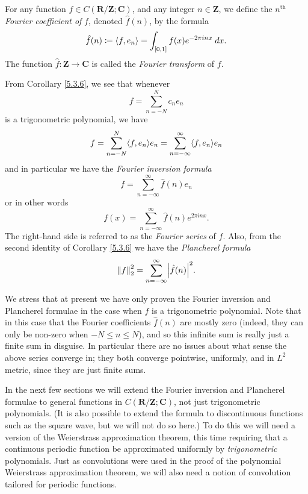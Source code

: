 \begin{definition}\label{5.3.7}
    For any function \(f \in C(\mathbf{R} / \mathbf{Z} ; \mathbf{C})\), and any integer \(n \in \mathbf{Z}\), we define the \(n^{\text{th}}\) \emph{Fourier coefficient of} \(f\), denoted \(\hat{f}(n)\), by the formula
    \[
        \hat{f}(n) \coloneqq \inner*{f, e_n} = \int_{[0, 1]} f(x) e^{- 2 \pi i n x} \; dx.
    \]
    The function \(\hat{f} : \mathbf{Z} \to \mathbf{C}\) is called the \emph{Fourier transform} of \(f\).
\end{definition}

\begin{additional corollary}\label{ac 5.3.1}
From Corollary \ref{5.3.6}, we see that whenever
\[
    f = \sum_{n = -N}^N c_n e_n
\]
is a trigonometric polynomial, we have
\[
    f = \sum_{n = -N}^N \inner*{f, e_n} e_n = \sum_{n = -\infty}^\infty \inner*{f, e_n} e_n
\]
and in particular we have the \emph{Fourier inversion formula}
\[
    f = \sum_{n = -\infty}^\infty \hat{f}(n) e_n
\]
or in other words
\[
    f(x) = \sum_{n = -\infty}^\infty \hat{f}(n) e^{2 \pi i n x}.
\]
The right-hand side is referred to as the \emph{Fourier series} of \(f\).
Also, from the second identity of Corollary \ref{5.3.6} we have the \emph{Plancherel formula}
\[
    \norm*{f}_2^2 = \sum_{n = -\infty}^\infty \abs*{\hat{f}(n)}^2.
\]
\end{additional corollary}

\begin{remark}\label{5.3.8}
    We stress that at present we have only proven the Fourier inversion and Plancherel formulae in the case when \(f\) is a trigonometric polynomial.
    Note that in this case that the Fourier coefficients \(\hat{f}(n)\) are mostly zero (indeed, they can only be non-zero when \(-N \leq n \leq N\)), and so this infinite sum is really just a finite sum in disguise.
    In particular there are no issues about what sense the above series converge in;
    they both converge pointwise, uniformly, and in \(L^2\) metric, since they are just finite sums.
\end{remark}

\begin{note}
    In the next few sections we will extend the Fourier inversion and Plancherel formulae to general functions in \(C(\mathbf{R} / \mathbf{Z} ; \mathbf{C})\), not just trigonometric polynomials.
    (It is also possible to extend the formula to discontinuous functions such as the square wave, but we will not do so here.)
    To do this we will need a version of the Weierstrass approximation theorem, this time requiring that a continuous periodic function be approximated uniformly by \emph{trigonometric} polynomials.
    Just as convolutions were used in the proof of the polynomial Weierstrass approximation theorem, we will also need a notion of convolution tailored for periodic functions.
\end{note}

